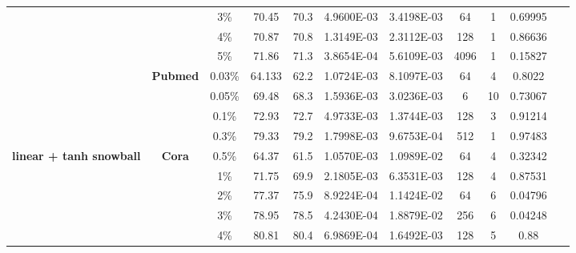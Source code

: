 \begin{table}[htbp]
\begin{tabular}{ccccc|cccccc}
          &       & 3\%   & \cellcolor[rgb]{ .388,  .745,  .482}70.45 & \cellcolor[rgb]{ .973,  .412,  .42}70.3 & 4.9600E-03 & 3.4198E-03 & 64    & 1     & 0.69995 & ~ \\
          &       & 4\%   & \cellcolor[rgb]{ .388,  .745,  .482}70.87 & \cellcolor[rgb]{ .973,  .412,  .42}70.8 & 1.3149E-03 & 2.3112E-03 & 128   & 1     & 0.86636 & ~ \\
          &       & 5\%   & \cellcolor[rgb]{ .388,  .745,  .482}71.86 & \cellcolor[rgb]{ .973,  .412,  .42}71.3 & 3.8654E-04 & 5.6109E-03 & 4096  & 1     & 0.15827 & ~ \\
          & \multirow{4}[1]{*}{\textbf{Pubmed}} & 0.03\% & \cellcolor[rgb]{ .388,  .745,  .482}64.133 & \cellcolor[rgb]{ .973,  .412,  .42}62.2 & 1.0724E-03 & 8.1097E-03 & 64    & 4     & 0.8022 & ~ \\
          &       & 0.05\% & \cellcolor[rgb]{ .388,  .745,  .482}69.48 & \cellcolor[rgb]{ .973,  .412,  .42}68.3 & 1.5936E-03 & 3.0236E-03 & 6     & 10    & 0.73067 & ~ \\
          &       & 0.1\% & \cellcolor[rgb]{ .388,  .745,  .482}72.93 & \cellcolor[rgb]{ .973,  .412,  .42}72.7 & 4.9733E-03 & 1.3744E-03 & 128   & 3     & 0.91214 & ~ \\
          &       & 0.3\% & \cellcolor[rgb]{ .388,  .745,  .482}79.33 & \cellcolor[rgb]{ .973,  .412,  .42}79.2 & 1.7998E-03 & 9.6753E-04 & 512   & 1     & 0.97483 & ~ \\
    \midrule
    \multirow{16}[2]{*}{\textbf{linear + tanh snowball}} & \multirow{6}[1]{*}{\textbf{Cora}} & 0.5\% & \cellcolor[rgb]{ .388,  .745,  .482}64.37 & \cellcolor[rgb]{ .973,  .412,  .42}61.5 & 1.0570E-03 & 1.0989E-02 & 64    & 4     & 0.32342 & ~ \\
          &       & 1\%   & \cellcolor[rgb]{ .388,  .745,  .482}71.75 & \cellcolor[rgb]{ .973,  .412,  .42}69.9 & 2.1805E-03 & 6.3531E-03 & 128   & 4     & 0.87531 & ~ \\
          &       & 2\%   & \cellcolor[rgb]{ .388,  .745,  .482}77.37 & \cellcolor[rgb]{ .973,  .412,  .42}75.9 & 8.9224E-04 & 1.1424E-02 & 64    & 6     & 0.04796 & ~ \\
          &       & 3\%   & \cellcolor[rgb]{ .388,  .745,  .482}78.95 & \cellcolor[rgb]{ .973,  .412,  .42}78.5 & 4.2430E-04 & 1.8879E-02 & 256   & 6     & 0.04248 & ~ \\
          &       & 4\%   & \cellcolor[rgb]{ .388,  .745,  .482}80.81 & \cellcolor[rgb]{ .973,  .412,  .42}80.4 & 6.9869E-04 & 1.6492E-03 & 128   & 5     & 0.88  & ~ \\

\end{tabular}
\end{table}
